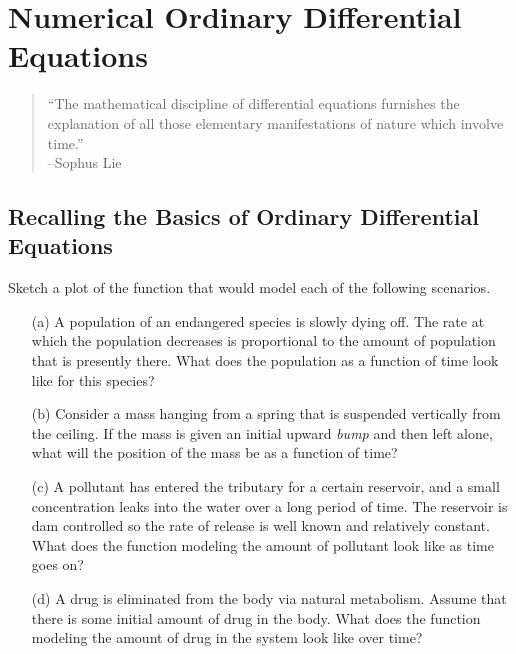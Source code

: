 \chapter{Numerical Ordinary Differential Equations}\label{ch:odes}
\begin{quote}
    ``The mathematical discipline of differential equations furnishes the explanation of
    all those elementary manifestations of nature which involve time.'' \\ --Sophus Lie
\end{quote}



\section{Recalling the Basics of Ordinary Differential Equations}

\begin{problem}
    Sketch a plot of the function that would model each of the following scenarios.
    \begin{enumerate}
        \item[(a)] A population of an endangered species is slowly dying off.  The rate at
            which the population decreases is proportional to the amount of population
            that is presently there.  What does the population as a function of time look
            like for this species?
        \item[(b)] Consider a mass hanging from a spring that is suspended vertically from
            the ceiling.  If the mass is given an initial upward {\it bump} and then left
            alone, what will the position of the mass be as a function of time?
        \item[(c)] A pollutant has entered the tributary for a certain reservoir, and a
            small concentration leaks into the water over a long period of time.  The
            reservoir is dam controlled so the rate of release is well known and
            relatively constant.  What does the function modeling the amount of pollutant
            look like as time goes on?
        \item[(d)] A drug is eliminated from the body via natural metabolism.  Assume that
            there is some initial amount of drug in the body.  What does the function
            modeling the amount of drug in the system look like over time? 
    \end{enumerate}
\end{problem}

